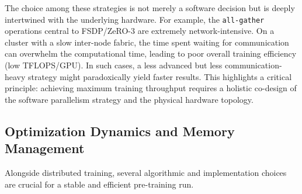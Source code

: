 \documentclass[12pt, a4paper]{article}
\begin{document}
The choice among these strategies is not merely a software decision but is deeply intertwined with the underlying hardware. For example, the \texttt{all-gather} operations central to FSDP/ZeRO-3 are extremely network-intensive. On a cluster with a slow inter-node fabric, the time spent waiting for communication can overwhelm the computational time, leading to poor overall training efficiency (low TFLOPS/GPU). In such cases, a less advanced but less communication-heavy strategy might paradoxically yield faster results. This highlights a critical principle: achieving maximum training throughput requires a holistic co-design of the software parallelism strategy and the physical hardware topology.

\begin{table}[h!]
\centering
\caption{Comparison of Distributed Training Strategies}
\label{tab:dist_train}
\end{table}

\subsection{Optimization Dynamics and Memory Management}

Alongside distributed training, several algorithmic and implementation choices are crucial for a stable and efficient pre-training run.
\end{document}
